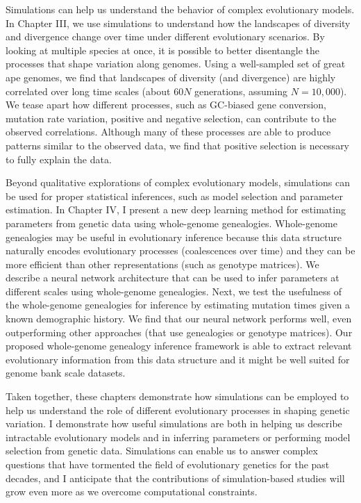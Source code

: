 Simulations can help us understand the behavior of complex evolutionary models.
In Chapter III, we use simulations to understand how the landscapes of diversity and divergence change over time under different evolutionary scenarios.
By looking at multiple species at once, it is possible to better disentangle the processes that shape variation along genomes.
Using a well-sampled set of great ape genomes, we find that landscapes of diversity (and divergence) are highly correlated over long time scales (about $60N$ generations, assuming $N=10,000$).
We tease apart how different processes, such as GC-biased gene conversion, mutation rate variation, positive and negative selection, can contribute to the observed correlations.
Although many of these processes are able to produce patterns similar to the observed data,
we find that positive selection is necessary to fully explain the data.

Beyond qualitative explorations of complex evolutionary models,
simulations can be used for proper statistical inferences, such as model selection and parameter estimation.
In Chapter IV, I present a new deep learning method for estimating parameters from genetic data using whole-genome genealogies.
Whole-genome genealogies may be useful in evolutionary inference because this data structure naturally encodes evolutionary processes (\eg coalescences over time) and they can be more efficient than other representations (such as genotype matrices).
We describe a neural network architecture that can be used to infer parameters at different scales using whole-genome genealogies.
Next, we test the usefulness of the whole-genome genealogies for inference by estimating mutation times given a known demographic history.
We find that our neural network performs well, even outperforming other approaches (that use genealogies or genotype matrices).
Our proposed whole-genome genealogy inference framework is able to extract relevant evolutionary information from this data structure and it might be well suited for genome bank scale datasets.

Taken together, these chapters demonstrate how simulations can be employed to help us understand the role of different evolutionary processes in shaping genetic variation.
I demonstrate how useful simulations are both in helping us describe intractable evolutionary models and in inferring parameters or performing model selection from genetic data.
Simulations can enable us to answer complex questions that have tormented the field of evolutionary genetics for the past decades, 
and I anticipate that the contributions of simulation-based studies will grow even more as we overcome computational constraints.
